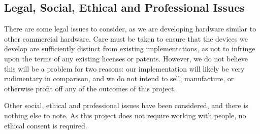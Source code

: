 \documentclass[a4paper,fleqn,12pt]{article}
\begin{document}
\subsection{Legal, Social, Ethical and Professional Issues}

There are some legal issues to consider, as we are developing hardware similar to other commercial hardware. Care must be taken to ensure that the devices we develop are sufficiently distinct from existing implementations, as not to infringe upon the terms of any existing licenses or patents. However, we do not believe this will be a problem for two reasons: our implementation will likely be very rudimentary in comparison, and we do not intend to sell, manufacture, or otherwise profit off any of the outcomes of this project.

Other social, ethical and professional issues have been considered, and there is nothing else to note. As this project does not require working with people, no ethical consent is required.


\appendix
\end{document}
